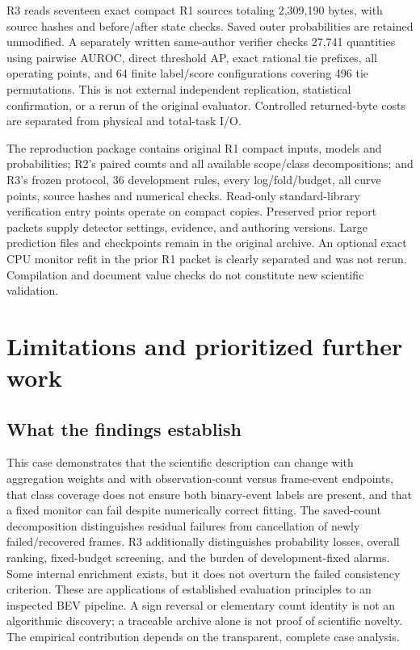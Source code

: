 \documentclass[conference]{IEEEtran}
\begin{document}
R3 reads seventeen exact compact R1 sources totaling 2,309,190 bytes, with source hashes and before/after state checks. Saved outer probabilities are retained unmodified. A separately written same-author verifier checks 27,741 quantities using pairwise AUROC, direct threshold AP, exact rational tie prefixes, all operating points, and 64 finite label/score configurations covering 496 tie permutations. This is not external independent replication, statistical confirmation, or a rerun of the original evaluator. Controlled returned-byte costs are separated from physical and total-task I/O.

The reproduction package contains original R1 compact inputs, models and probabilities; R2's paired counts and all available scope/class decompositions; and R3's frozen protocol, 36 development rules, every log/fold/budget, all curve points, source hashes and numerical checks. Read-only standard-library verification entry points operate on compact copies. Preserved prior report packets supply detector settings, evidence, and authoring versions. Large prediction files and checkpoints remain in the original archive. An optional exact CPU monitor refit in the prior R1 packet is clearly separated and was not rerun. Compilation and document value checks do not constitute new scientific validation.

\section{Limitations and prioritized further work}
\subsection{What the findings establish}
This case demonstrates that the scientific description can change with aggregation weights and with observation-count versus frame-event endpoints, that class coverage does not ensure both binary-event labels are present, and that a fixed monitor can fail despite numerically correct fitting. The saved-count decomposition distinguishes residual failures from cancellation of newly failed/recovered frames. R3 additionally distinguishes probability losses, overall ranking, fixed-budget screening, and the burden of development-fixed alarms. Some internal enrichment exists, but it does not overturn the failed consistency criterion. These are applications of established evaluation principles to an inspected BEV pipeline. A sign reversal or elementary count identity is not an algorithmic discovery; a traceable archive alone is not proof of scientific novelty. The empirical contribution depends on the transparent, complete case analysis.
\end{document}
